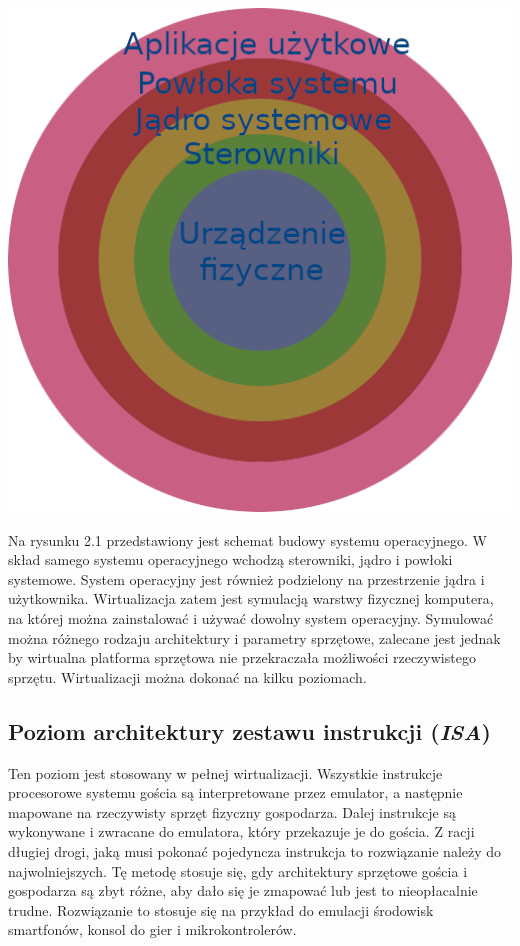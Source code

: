 \documentclass[polish, a4paper, 12pt, oneside]{book}
\begin{document}
	\begin{center}
		\includegraphics[width=160mm]{schemat_os.png}
	\end{center}
	
	Na rysunku 2.1 przedstawiony jest schemat budowy systemu operacyjnego. W skład samego systemu operacyjnego wchodzą sterowniki, jądro i powłoki systemowe. System operacyjny jest również podzielony na przestrzenie jądra i użytkownika. Wirtualizacja zatem jest symulacją warstwy fizycznej komputera, na której można zainstalować i używać dowolny system operacyjny. Symulować można różnego rodzaju architektury i parametry sprzętowe, zalecane jest jednak by wirtualna platforma sprzętowa nie przekraczała możliwości rzeczywistego sprzętu. Wirtualizacji można dokonać na kilku poziomach. 
	\subsection {Poziom architektury zestawu instrukcji (\textit{ISA})}
	Ten poziom jest stosowany w pełnej wirtualizacji. Wszystkie instrukcje procesorowe systemu gościa są interpretowane przez emulator, a następnie mapowane na rzeczywisty sprzęt fizyczny gospodarza. Dalej instrukcje są wykonywane i zwracane do emulatora, który przekazuje je do gościa. Z racji długiej drogi, jaką musi pokonać pojedyncza instrukcja to rozwiązanie należy do najwolniejszych. Tę metodę stosuje się, gdy architektury sprzętowe gościa i gospodarza są zbyt różne, aby dało się je zmapować lub jest to nieopłacalnie trudne. Rozwiązanie to stosuje się na przykład do emulacji środowisk smartfonów, konsol do gier i mikrokontrolerów.
\end{document}
